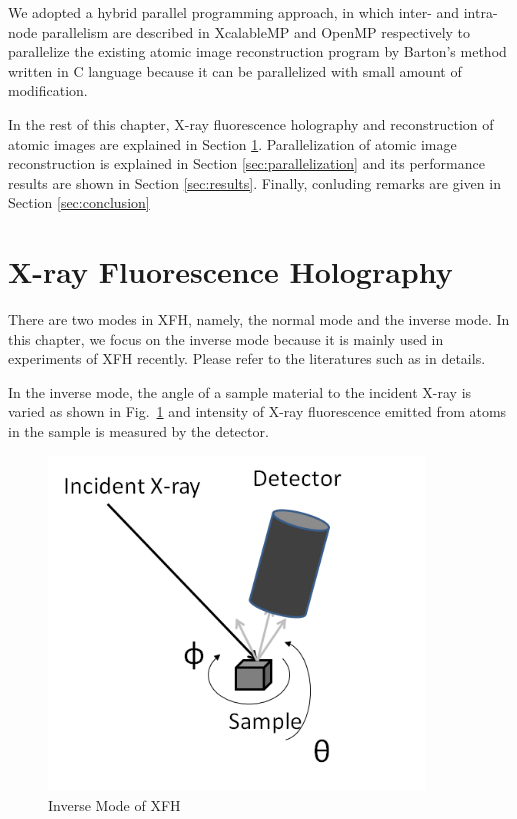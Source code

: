\documentclass[graybox,vecphys]{svmult}
\begin{document}
We adopted a hybrid parallel programming approach, in which inter- and
intra- node parallelism are described in XcalableMP and OpenMP
respectively to parallelize the existing atomic image reconstruction
program by Barton's method written in C language because it
can be parallelized with small amount of modification.

In the rest of this chapter, X-ray fluorescence holography
and reconstruction of atomic images are explained in Section \ref{sec:xfh}.
Parallelization of atomic image reconstruction is explained
in Section \ref{sec:parallelization} and its performance results are
shown in Section \ref{sec:results}. Finally, conluding remarks are
given in Section \ref{sec:conclusion}


\section{X-ray Fluorescence Holography}\label{sec:xfh}

There are two modes in XFH, namely, the normal mode and the inverse
mode.  In this chapter, we focus on the inverse mode because it is
mainly used in experiments of XFH recently. Please refer to the
literatures such as \cite{Hayashi-JSSRR2013-Eng} in details.

In the inverse mode, the angle of a sample material to the incident
X-ray is varied as shown in Fig.~\ref{fig:inverse} and intensity
of X-ray fluorescence emitted from atoms in the sample is measured
by the detector.

\begin{figure}[tb]
  \begin{center}
  \includegraphics[width=10cm]{inverse.png}
  \caption{Inverse Mode of XFH}\label{fig:inverse}
  \end{center}
\end{figure}
\end{document}
